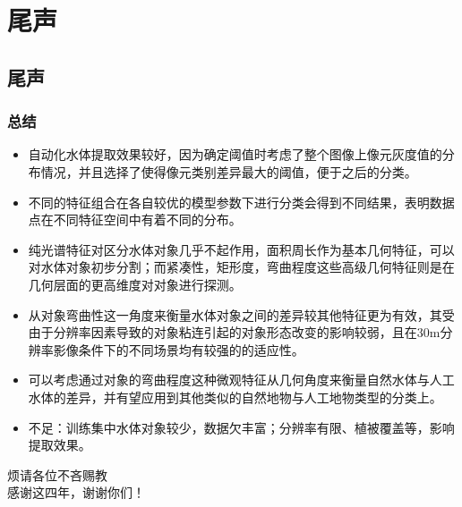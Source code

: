 \documentclass[10pt]{beamer}
\begin{document}
\section{尾声}
\subsection{尾声}
\begin{frame}
	\frametitle{总结}
	\small
	\begin{itemize}
	
	\item [\uppercase\expandafter{\romannumeral1}]自动化水体提取效果较好，因为确定阈值时考虑了整个图像上像元灰度值的分布情况，并且选择了使得像元类别差异最大的阈值，便于之后的分类。
	
	\item [\uppercase\expandafter{\romannumeral2}]不同的特征组合在各自较优的模型参数下进行分类会得到不同结果，表明数据点在不同特征空间中有着不同的分布。 
	
	\item [\uppercase\expandafter{\romannumeral3}]纯光谱特征对区分水体对象几乎不起作用，面积周长作为基本几何特征，可以对水体对象初步分割；而紧凑性，矩形度，弯曲程度这些高级几何特征则是在几何层面的更高维度对对象进行探测。
	
	\item [\uppercase\expandafter{\romannumeral4}]从对象弯曲性这一角度来衡量水体对象之间的差异较其他特征更为有效，其受由于分辨率因素导致的对象粘连引起的对象形态改变的影响较弱，且在30m分辨率影像条件下的不同场景均有较强的的适应性。
	
	\item [\uppercase\expandafter{\romannumeral5}]可以考虑通过对象的弯曲程度这种微观特征从几何角度来衡量自然水体与人工水体的差异，并有望应用到其他类似的自然地物与人工地物类型的分类上。
	
	\item [\uppercase\expandafter{\romannumeral6}]\alert{不足}：训练集中水体对象较少，数据欠丰富；分辨率有限、植被覆盖等，影响提取效果。
	\end{itemize}
\end{frame}
\begin{frame}
	\centering
	\Huge
	烦请各位不吝赐教\\[5ex]
	感谢这四年，谢谢你们！
\end{frame}
\end{document}
